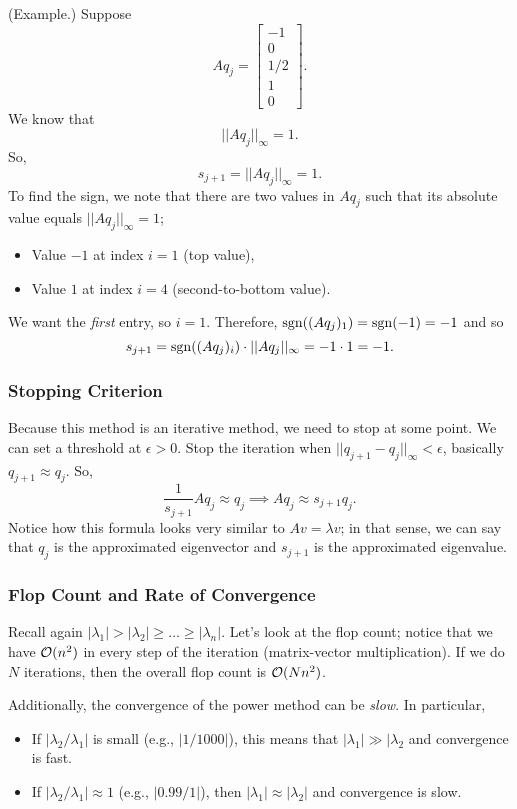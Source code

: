 \documentclass[letterpaper]{article}
\newcommand{\0}{\mathbf{0}}
\begin{document}
\begin{mdframed}
    (Example.) Suppose \[Aq_j = \begin{bmatrix}
        -1 \\ 0 \\ 1/2 \\ 1 \\ 0
    \end{bmatrix}.\]
    We know that \[||Aq_j||_\infty = 1.\] So, \[s_{j + 1} = ||Aq_j||_\infty = 1.\]
    To find the sign, we note that there are two values in $Aq_j$ such that its absolute value equals $||Aq_j||_\infty = 1$; 
    \begin{itemize}
        \item Value $-1$ at index $i = 1$ (top value),
        \item Value $1$ at index $i = 4$ (second-to-bottom value).
    \end{itemize}
    We want the \emph{first} entry, so $i = 1$. Therefore, $\operatorname{sgn}((Aq_j)_1) = \operatorname{sgn}(-1) = -1$ and so 
    \[s_{j + 1} = \operatorname{sgn}((Aq_j)_i) \cdot ||Aq_j||_\infty = -1 \cdot 1 = -1.\]
\end{mdframed}

\subsubsection{Stopping Criterion}
Because this method is an iterative method, we need to stop at some point. We can set a threshold at $\epsilon > 0$. Stop the iteration when $||q_{j + 1} - q_j||_\infty < \epsilon$, basically $q_{j + 1} \approx q_j$. So, 
\[\frac{1}{s_{j + 1}}Aq_j \approx q_j \implies Aq_j \approx s_{j + 1} q_j.\]
Notice how this formula looks very similar to $Av = \lambda v$; in that sense, we can say that $q_j$ is the approximated eigenvector and $s_{j + 1}$ is the approximated eigenvalue.

\subsubsection{Flop Count and Rate of Convergence}
Recall again $|\lambda_1| > |\lambda_2| \geq \hdots \geq |\lambda_n|$. Let's look at the flop count; notice that we have $\mathcal{O}(n^2)$ in every step of the iteration (matrix-vector multiplication). If we do $N$ iterations, then the overall flop count is $\mathcal{O}(Nn^2)$. 

\bigskip 

Additionally, the convergence of the power method can be \emph{slow}. In particular, 
\begin{itemize}
    \item If $|\lambda_2 / \lambda_1|$ is small (e.g., $|1 / 1000|$), this means that $|\lambda_1| \gg |\lambda_2$ and convergence is fast. 
    \item If $|\lambda_2 / \lambda_1| \approx 1$ (e.g., $|0.99 / 1|$), then $|\lambda_1| \approx |\lambda_2|$ and convergence is slow.
\end{itemize}
\end{document}

